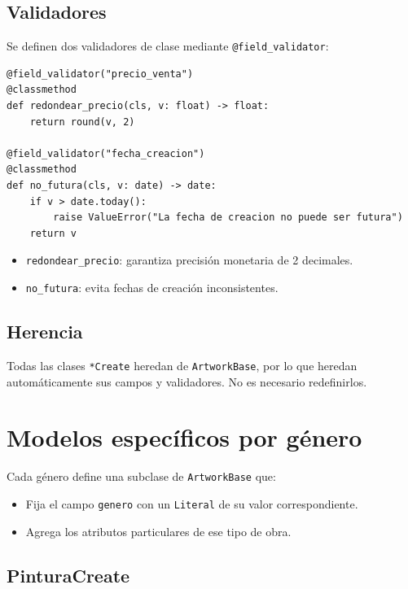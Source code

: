 \documentclass[12pt,a4paper]{article}
\begin{document}
\subsection{Validadores}

Se definen dos validadores de clase mediante \texttt{@field\_validator}:

\begin{lstlisting}
@field_validator("precio_venta")
@classmethod
def redondear_precio(cls, v: float) -> float:
    return round(v, 2)

@field_validator("fecha_creacion")
@classmethod
def no_futura(cls, v: date) -> date:
    if v > date.today():
        raise ValueError("La fecha de creacion no puede ser futura")
    return v
\end{lstlisting}

\begin{itemize}
    \item \texttt{redondear\_precio}: garantiza precisión monetaria de 2 decimales.
    \item \texttt{no\_futura}: evita fechas de creación inconsistentes.
\end{itemize}

\subsection{Herencia}

Todas las clases \texttt{*Create} heredan de \texttt{ArtworkBase}, por lo que
heredan automáticamente sus campos y validadores. No es necesario redefinirlos.

\section{Modelos específicos por género}

Cada género define una subclase de \texttt{ArtworkBase} que:
\begin{itemize}
    \item Fija el campo \texttt{genero} con un \texttt{Literal} de su valor
          correspondiente.
    \item Agrega los atributos particulares de ese tipo de obra.
\end{itemize}

\subsection{PinturaCreate}
\end{document}
